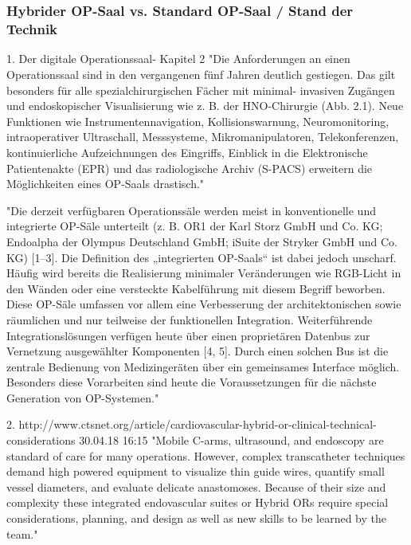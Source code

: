 \chapter{}
\label{sec:overview}

\subsection{Hybrider OP-Saal vs. Standard OP-Saal / Stand der Technik}
1. Der digitale Operationssaal- Kapitel 2
	"Die Anforderungen an einen Operationssaal sind in den vergangenen fünf Jahren
	deutlich gestiegen. Das gilt besonders für alle spezialchirurgischen Fächer mit minimal-
	invasiven Zugängen und endoskopischer Visualisierung wie z. B. der HNO-Chirurgie
	(Abb. 2.1). Neue Funktionen wie Instrumentennavigation, Kollisionswarnung,
	Neuromonitoring, intraoperativer Ultraschall, Messsysteme, Mikromanipulatoren,
	Telekonferenzen, kontinuierliche Aufzeichnungen des Eingriffs, Einblick in die Elektronische
	Patientenakte (EPR) und das radiologische Archiv (S-PACS) erweitern die
	Möglichkeiten eines OP-Saals drastisch."
	
	"Die derzeit verfügbaren Operationssäle werden meist in konventionelle und integrierte
	OP-Säle unterteilt (z. B. OR1 der Karl Storz GmbH und Co. KG; Endoalpha der
	Olympus Deutschland GmbH; iSuite der Stryker GmbH und Co. KG) [1–3]. Die Definition
	des „integrierten OP-Saals“ ist dabei jedoch unscharf. Häufig wird bereits die Realisierung
	minimaler Veränderungen wie RGB-Licht in den Wänden oder eine versteckte
	Kabelführung mit diesem Begriff beworben. Diese OP-Säle umfassen vor allem eine
	Verbesserung der architektonischen sowie räumlichen und nur teilweise der funktionellen
	Integration.
	Weiterführende Integrationslösungen verfügen heute über einen proprietären
	Datenbus zur Vernetzung ausgewählter Komponenten [4, 5]. Durch einen solchen
	Bus ist die zentrale Bedienung von Medizingeräten über ein gemeinsames Interface
	möglich. Besonders diese Vorarbeiten sind heute die Voraussetzungen für die nächste
	Generation von OP-Systemen."

2. http://www.ctsnet.org/article/cardiovascular-hybrid-or-clinical-technical-considerations	30.04.18 16:15
	"Mobile C-arms, ultrasound, and endoscopy are standard of care for many operations. However, complex transcatheter techniques demand high powered equipment to visualize thin guide wires, quantify small vessel diameters, and evaluate delicate anastomoses. Because of their size and complexity these integrated endovascular suites or Hybrid ORs require special considerations, planning, and design as well as new skills to be learned by the team."

